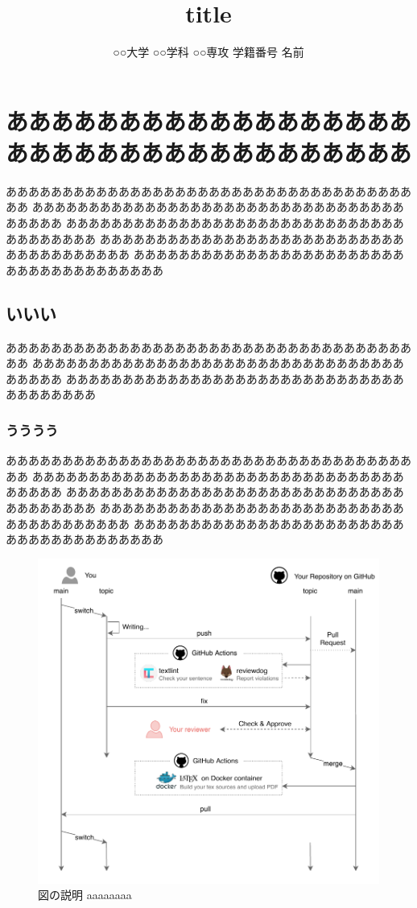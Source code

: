\documentclass{classes/resume}
\title{
	title
}
\author{
	○○大学 ○○学科 ○○専攻 学籍番号 名前
}
\begin{document}
\maketitle

\section{ああああああああああああああああああああああああああああああああああああ}
ああああああああああああああああああああああああああああああああああああああ
ああああああああああああああああああああああああああああああああああああああ
ああああああああああああああああああああああああああああああああああああああ
ああああああああああああああああああああああああああああああああああああああ
ああああああああああああああああああああああああああああああああああああああ
\subsection{いいい}
ああああああああああああああああああああああああああああああああああああああ
ああああああああああああああああああああああああああああああああああああああ
ああああああああああああああああああああああああああああああああああああああ
\subsubsection{うううう}
ああああああああああああああああああああああああああああああああああああああ
ああああああああああああああああああああああああああああああああああああああ
ああああああああああああああああああああああああああああああああああああああ
ああああああああああああああああああああああああああああああああああああああ
ああああああああああああああああああああああああああああああああああああああ

\begin{figure}[htbp]
	\centering
	\includegraphics[width=\linewidth]{figures/textlint_workflow.pdf}
	\caption{図の説明 aaaaaaaa\cite{ref:nomura2022uwb}\cite{ref:青空文庫Aozo22:online}}
	\label{fig:fig1}
\end{figure}
\end{document}
